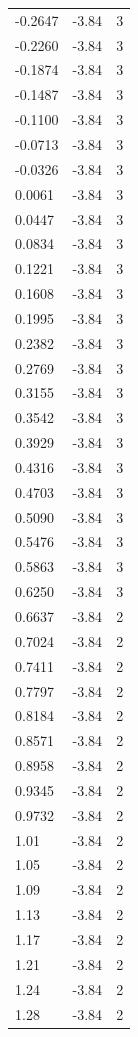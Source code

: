 \begin{longtable}{lrr}
  -0.2647 & -3.84 & 3 \\
  -0.2260 & -3.84 & 3 \\
  -0.1874 & -3.84 & 3 \\
  -0.1487 & -3.84 & 3 \\
  -0.1100 & -3.84 & 3 \\
  -0.0713 & -3.84 & 3 \\
  -0.0326 & -3.84 & 3 \\
  0.0061 & -3.84 & 3 \\
  0.0447 & -3.84 & 3 \\
  0.0834 & -3.84 & 3 \\
  0.1221 & -3.84 & 3 \\
  0.1608 & -3.84 & 3 \\
  0.1995 & -3.84 & 3 \\
  0.2382 & -3.84 & 3 \\
  0.2769 & -3.84 & 3 \\
  0.3155 & -3.84 & 3 \\
  0.3542 & -3.84 & 3 \\
  0.3929 & -3.84 & 3 \\
  0.4316 & -3.84 & 3 \\
  0.4703 & -3.84 & 3 \\
  0.5090 & -3.84 & 3 \\
  0.5476 & -3.84 & 3 \\
  0.5863 & -3.84 & 3 \\
  0.6250 & -3.84 & 3 \\
  0.6637 & -3.84 & 2 \\
  0.7024 & -3.84 & 2 \\
  0.7411 & -3.84 & 2 \\
  0.7797 & -3.84 & 2 \\
  0.8184 & -3.84 & 2 \\
  0.8571 & -3.84 & 2 \\
  0.8958 & -3.84 & 2 \\
  0.9345 & -3.84 & 2 \\
  0.9732 & -3.84 & 2 \\
  1.01 & -3.84 & 2 \\
  1.05 & -3.84 & 2 \\
  1.09 & -3.84 & 2 \\
  1.13 & -3.84 & 2 \\
  1.17 & -3.84 & 2 \\
  1.21 & -3.84 & 2 \\
  1.24 & -3.84 & 2 \\
  1.28 & -3.84 & 2 \\

\end{longtable}
